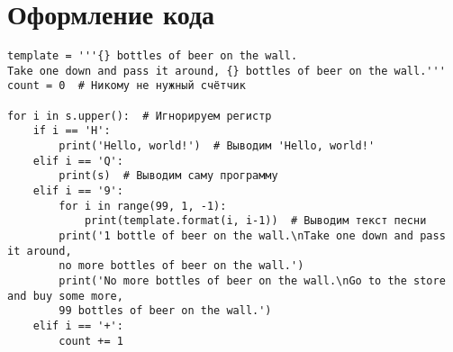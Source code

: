 \documentclass[12pt, a4paper]{article}
\begin{document}
\section{Оформление кода}

\begin{verbatim}
template = '''{} bottles of beer on the wall.
Take one down and pass it around, {} bottles of beer on the wall.'''
count = 0  # Никому не нужный счётчик

for i in s.upper():  # Игнорируем регистр
    if i == 'H':
        print('Hello, world!')  # Выводим 'Hello, world!'
    elif i == 'Q':
        print(s)  # Выводим саму программу
    elif i == '9':
        for i in range(99, 1, -1):
            print(template.format(i, i-1))  # Выводим текст песни
        print('1 bottle of beer on the wall.\nTake one down and pass it around, 
        no more bottles of beer on the wall.')
        print('No more bottles of beer on the wall.\nGo to the store and buy some more, 
        99 bottles of beer on the wall.')
    elif i == '+':
        count += 1       
\end{verbatim}
\end{document}

